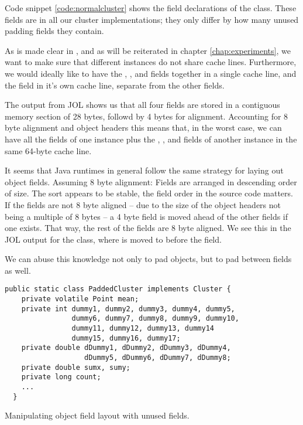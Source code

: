 Code snippet \ref{code:normalcluster} shows the field declarations of the
 class. These fields are in all our cluster implementations;
they only differ by how many unused padding fields they contain.

As is made clear in \cite{mystery}, and as will be reiterated in chapter
\ref{chap:experiments}, we want to make sure that different 
instances do not share cache lines. Furthermore, we would
ideally like to have the , , and  fields
together in a single cache line, and the  field in it's own
cache line, separate from the other fields.

The output from JOL shows us that all four fields are stored in a contiguous
memory section of 28 bytes, followd by 4 bytes for alignment. Accounting for 8 byte alignment and object headers
this means that, in the worst case, we can have all the fields of one
 instance plus the , , and 
fields of another instance in the same 64-byte cache line.

It seems that Java runtimes in general follow the same strategy for laying out
object fields. Assuming 8 byte alignment: Fields are arranged in descending
order of size. The sort appears to be stable, the field order in the source code
matters. If the fields are not 8 byte aligned -- due to the size of the object
headers not being a multiple of 8 bytes -- a 4 byte field is moved ahead of the
other fields if one exists. That way, the rest of the fields are 8 byte aligned.
We see this in the JOL output for the  class, where
 is moved to before the  field.

We can abuse this knowledge not only to pad objects, but to pad between fields
as well.

\begin{padding}[h]
\begin{Verbatim}[frame=single]
  public static class PaddedCluster implements Cluster {
    private volatile Point mean;
    private int dummy1, dummy2, dummy3, dummy4, dummy5,
                dummy6, dummy7, dummy8, dummy9, dummy10,
                dummy11, dummy12, dummy13, dummy14
                dummy15, dummy16, dummy17;
    private double dDummy1, dDummy2, dDummy3, dDummy4,
                   dDummy5, dDummy6, dDummy7, dDummy8;
    private double sumx, sumy;
    private long count;
    ...
  }
\end{Verbatim}
	\caption{Manipulating object field layout with unused fields.}
	\label{padding:object-fields}
\end{padding}

